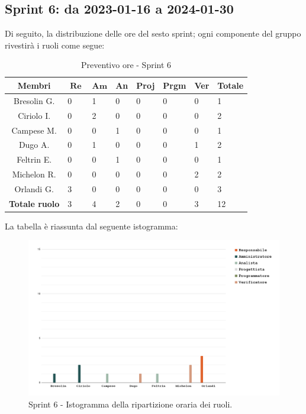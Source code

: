 \documentclass[10pt, a4paper]{article}
\begin{document}
\subsection{Sprint 6: da 2023-01-16 a 2024-01-30}
Di seguito, la distribuzione delle ore del sesto sprint; ogni componente del gruppo rivestirà i ruoli come segue:
\begin{table}[H]
\begin{tabularx}{\textwidth}{c|X|X|X|X|X|X|X}
        \textbf{Membri} & $\operatorname{\textbf{Re}}$ & $\mathrm{\textbf{Am}}$ & \textbf{An} & \textbf{Proj} & \textbf{Prgm} & \textbf{Ver} & \textbf{Totale} \\
        \hline Bresolin G. & 0 & \cellcolor{primarycolor}1 & 0 & 0 & 0 & 0 & 1 \\
        \hline Ciriolo I.  & 0 & \cellcolor{primarycolor}2 & 0 & 0 & 0 & 0 & 2 \\
        \hline Campese M.  & 0 & 0 & \cellcolor{primarycolor}1 & 0 & 0 & 0 & 1 \\
        \hline Dugo A.     & 0 & \cellcolor{primarycolor}1 & 0 & 0 & 0 & 1 & 2 \\
        \hline Feltrin E.  & 0 & 0 & \cellcolor{primarycolor}1 & 0 & 0 & 0 & 1 \\
        \hline Michelon R. & 0 & 0 & 0 & 0 & 0 & \cellcolor{primarycolor}2 & 2 \\
        \hline Orlandi G.  & \cellcolor{primarycolor}3 & 0 & 0 & 0 & 0 & 0 & 3 \\
        \hline
        \textbf{Totale ruolo} & 3 & 4 & 2 & 0 & 0 & 3 & 12
    \end{tabularx}
    \caption{Preventivo ore - Sprint 6}
    \end{table}

La tabella è riassunta dal seguente istogramma:
 \begin{figure}[H]
        \centering        
        \includegraphics[width=15.5cm]{istogrammi/istogramma_6_periodo.png}
        \caption{Sprint 6 - Istogramma della ripartizione oraria dei ruoli. }
    \end{figure}
\end{document}
